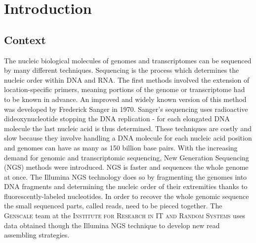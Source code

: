 \documentclass[12pt]{article}
\begin{document}
\thispagestyle{empty}
\clearpage
\hypersetup{linkcolor=gray}
\tableofcontents
\thispagestyle{empty}
\newpage
\section{Introduction}
\setcounter{page}{1}
\subsection{Context}
The nucleic biological molecules of genomes and transcriptomes can be sequenced by many different techniques. Sequencing is the process which determines the nucleic order within DNA and RNA. The first methods involved the extension of location-specific primers, meaning portions of the genome or transcriptome had to be known in advance. An improved and widely known version of this method was developed by Frederick Sanger in 1970. Sanger's sequencing uses radioactive dideoxynucleotide stopping the DNA replication - for each elongated DNA molecule the last nucleic acid is thus determined. These techniques are costly and slow because they involve handling a DNA molecule for each nucleic acid position and genomes can have as many as 150 billion base pairs. With the increasing demand for genomic and transcriptomic sequencing, New Generation Sequencing (NGS) methods were introduced. NGS is faster and sequences the whole genome at once. The Illumina NGS technology does so by fragmenting the genomes into DNA fragments and determining the nucleic order of their extremities thanks to fluorescently-labeled nucleotides. In order to recover the whole genomic sequence the small sequenced parts, called reads, need to be pieced together. The \textsc{Genscale} team at the \textsc{Institute for Research in IT and Random Systems} uses data obtained though the Illumina NGS technique to develop new read assembling strategies.
\end{document}
